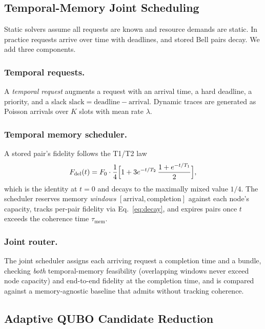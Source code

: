 \documentclass[twocolumn]{article}
\begin{document}
\subsection{Temporal-Memory Joint Scheduling}
\label{sec:joint}

Static solvers assume all requests are known and resource demands are
static.  In practice requests arrive over time with deadlines, and
stored Bell pairs decay.  We add three components.

\subsubsection{Temporal requests.}
A \emph{temporal request} augments a request with an arrival time, a
hard deadline, a priority, and a slack
$\text{slack} = \text{deadline} - \text{arrival}$.  Dynamic traces are
generated as Poisson arrivals over $K$ slots with mean rate $\lambda$.

\subsubsection{Temporal memory scheduler.}
A stored pair's fidelity follows the T1/T2 law
\begin{equation}
  \label{eq:decay}
  F_{\text{del}}(t) = F_0 \cdot \frac{1}{4}
    \Bigl[1 + 3 e^{-t/T_2}\,\frac{1 + e^{-t/T_1}}{2}\Bigr],
\end{equation}
which is the identity at $t=0$ and decays to the maximally mixed value
$1/4$.  The scheduler reserves memory \emph{windows}
$[\text{arrival},\text{completion}]$ against each node's capacity,
tracks per-pair fidelity via Eq.~\eqref{eq:decay}, and expires pairs
once $t$ exceeds the coherence time $\tau_{\text{mem}}$.

\subsubsection{Joint router.}
The joint scheduler assigns each arriving request a completion time and
a bundle, checking \emph{both} temporal-memory feasibility
(overlapping windows never exceed node capacity) and end-to-end
fidelity at the completion time, and is compared against a
memory-agnostic baseline that admits without tracking coherence.

\subsection{Adaptive QUBO Candidate Reduction}
\label{sec:adaptive-qubo}
\end{document}
